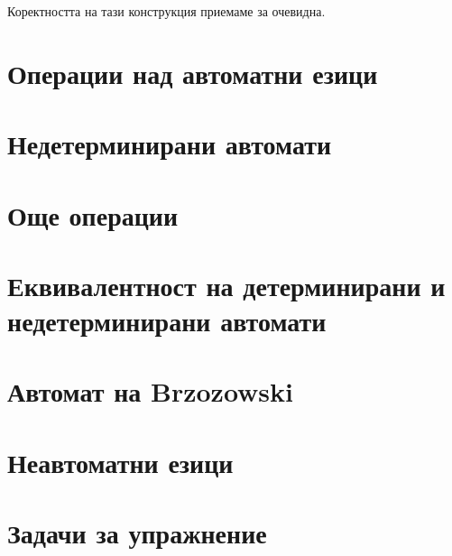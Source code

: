 Коректността на тази конструкция приемаме за очевидна.

\section{Операции над автоматни езици}

\section{Недетерминирани автомати}

\section{Още операции}

\section{Еквивалентност на детерминирани и недетерминирани автомати}

\section{Автомат на Brzozowski}

\section{Неавтоматни езици}

\section{Задачи за упражнение}